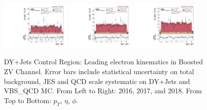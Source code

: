 \begin{figure}[!ht]
  \includegraphics[width=0.30\textwidth]{analysis_plots/2016_zv/cr_vjets_e/lep1_phi.pdf}
  \includegraphics[width=0.30\textwidth]{analysis_plots/2017_zv/cr_vjets_e/lep1_phi.pdf}
  \includegraphics[width=0.30\textwidth]{analysis_plots/2018_zv/cr_vjets_e/lep1_phi.pdf} \\
  \caption[DY+Jets Control Region: Leading electron kinematics in Boosted ZV Channel]%
  {DY+Jets Control Region: Leading electron kinematics in Boosted ZV Channel.
    Error bars include statistical uncertainty on total background,
    JES and QCD scale systematic on DY+Jets and VBS\_QCD MC\@.
    From Left to Right: 2016,
    2017, and 2018. From Top to Bottom: \( p_T \), \( \eta \), \( \phi \).}%
  \label{fig:zv-cr-vjets-e-lep1-pt-eta-phi}
\end{figure}

